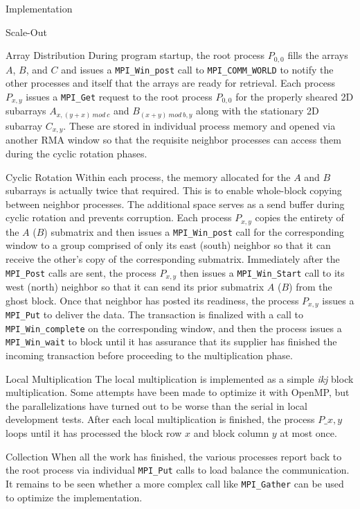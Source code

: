 \documentclass{article}
\begin{document}
\begin{section}{Implementation}
\begin{subsection}{Scale-Out}
\begin{paragraph}{}
    \end{paragraph}
    \begin{paragraph}{Array Distribution}
      During program startup, the root process $P_{0,0}$ fills the arrays $A$, $B$, and $C$ and issues a \texttt{MPI\_Win\_post} call to \texttt{MPI\_COMM\_WORLD}
      to notify the other processes and itself that the arrays are ready for retrieval. Each process $P_{x,y}$ issues a \texttt{MPI\_Get} request
      to the root process $P_{0,0}$ for the properly sheared 2D subarrays $A_{x,(y+x)\ mod\ c}$ and $B_{(x+y)\ mod\ b, y}$ along with the stationary
      2D subarray $C_{x,y}$. These are stored in individual process memory and opened via another RMA window so that the requisite neighbor processes
      can access them during the cyclic rotation phases.
    \end{paragraph}
    \begin{paragraph}{Cyclic Rotation}
      Within each process, the memory allocated for the $A$ and $B$ subarrays is actually twice that required. This is to enable whole-block copying
      between neighbor processes. The additional space serves as a send buffer during cyclic rotation and prevents corruption. Each process $P_{x,y}$
      copies the entirety of the $A$ ($B$) submatrix and then issues a \texttt{MPI\_Win\_post} call for the corresponding window to a group comprised of
      only its east (south) neighbor so that it can receive the other's copy of the corresponding submatrix. Immediately after the \texttt{MPI\_Post}
      calls are sent, the process $P_{x,y}$ then issues a \texttt{MPI\_Win\_Start} call to its west (north) neighbor so that it can send its prior submatrix
      $A$ ($B$) from the ghost block. Once that neighbor has posted its readiness, the process $P_{x,y}$ issues a \texttt{MPI\_Put} to deliver the data.
      The transaction is finalized with a call to \texttt{MPI\_Win\_complete} on the corresponding window, and then the process issues a \texttt{MPI\_Win\_wait}
      to block until it has assurance that its supplier has finished the incoming transaction before proceeding to the multiplication phase.
    \end{paragraph}
    \begin{paragraph}{Local Multiplication}
      The local multiplication is implemented as a simple \emph{ikj} block multiplication. Some attempts have been made to optimize it
      with OpenMP, but the parallelizations have turned out to be worse than the serial in local development tests.
      After each local multiplication is finished, the process $P\_{x,y}$ loops until it has processed the block row $x$ and block column $y$
      at most once.
    \end{paragraph}
    \begin{paragraph}{Collection}
      When all the work has finished, the various processes report back to the root process via individual \texttt{MPI\_Put} calls to load balance
      the communication. It remains to be seen whether a more complex call like \texttt{MPI\_Gather} can be used to optimize the implementation.
    \end{paragraph}
  \end{subsection}
\end{section}
\printbibliography
\end{document}
